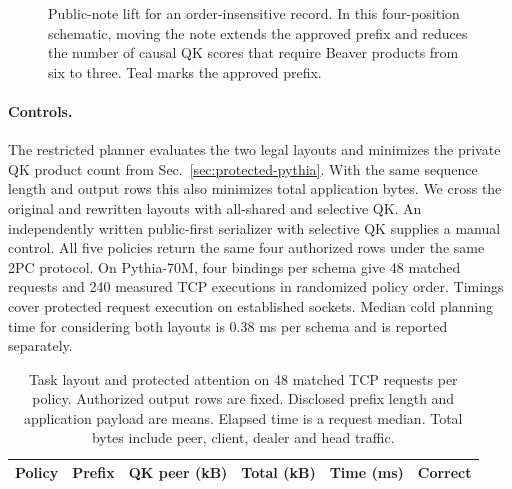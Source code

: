 \documentclass[runningheads]{llncs}
\begin{document}
\begin{figure}[!t]
\centering

\caption{Public-note lift for an order-insensitive record. In this
four-position schematic, moving the note extends the approved prefix
and reduces the number of causal QK scores that require Beaver
products from six to three. Teal marks the approved prefix.}
\label{fig:record-lift}
\end{figure}

\paragraph{Controls.}
The restricted planner evaluates the two legal layouts and minimizes
the private QK product count from Sec.~\ref{sec:protected-pythia}.
With the same sequence length and output rows this also minimizes
total application bytes. We cross the original and rewritten layouts
with all-shared and selective QK. An independently written
public-first serializer with selective QK supplies a manual
control. All five policies return the same four authorized rows under
the same 2PC protocol. On Pythia-70M, four bindings per schema give 48 matched
requests and 240 measured TCP executions in randomized policy order.
Timings cover protected request execution on established sockets.
Median cold planning time for considering both layouts is 0.38 ms per
schema and is reported separately.

\begin{table}[!ht]
\centering
\caption{Task layout and protected attention on 48 matched TCP requests
per policy. Authorized output rows are fixed. Disclosed prefix length and
application payload are means. Elapsed time is a request median.
Total bytes include peer, client, dealer and head traffic.}
\label{tab:compiled}
\small\renewcommand{\arraystretch}{1.12}\setlength{\tabcolsep}{5pt}
\begin{tabular}{@{}lrrrrr@{}}
\toprule
Policy & Prefix & QK peer (kB) & Total (kB) & Time (ms) & Correct\\
\midrule

\end{tabular}
\end{table}
\end{document}
